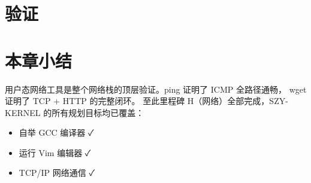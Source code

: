 \section{验证}
\label{sec:nettools-verify}


\section{本章小结}

用户态网络工具是整个网络栈的顶层验证。ping 证明了 ICMP 全路径通畅，
wget 证明了 TCP + HTTP 的完整闭环。
至此里程碑 H（网络）全部完成，SZY-KERNEL 的所有规划目标均已覆盖：
\begin{itemize}
  \item 自举 GCC 编译器 ✓
  \item 运行 Vim 编辑器 ✓
  \item TCP/IP 网络通信 ✓
\end{itemize}
